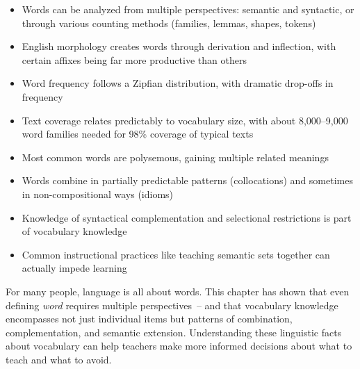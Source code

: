 \begin{itemize}[noitemsep]
\item Words can be analyzed from multiple perspectives: semantic and syntactic, or through various counting methods (families, lemmas, shapes, tokens)
\item English morphology creates words through derivation and inflection, with certain affixes being far more productive than others
\item Word frequency follows a Zipfian distribution, with dramatic drop-offs in frequency
\item Text coverage relates predictably to vocabulary size, with about 8,000--9,000 word families needed for 98\% coverage of typical texts
\item Most common words are polysemous, gaining multiple related meanings
\item Words combine in partially predictable patterns (collocations) and sometimes in non-compositional ways (idioms)
\item Knowledge of syntactical complementation and selectional restrictions is part of vocabulary knowledge
\item Common instructional practices like teaching semantic sets together can actually impede learning
\end{itemize}

For many people, language is all about words. This chapter has shown that even defining \textit{word} requires multiple perspectives~-- and that vocabulary knowledge encompasses not just individual items but patterns of combination, complementation, and semantic extension. Understanding these linguistic facts about vocabulary can help teachers make more informed decisions about what to teach and what to avoid.

